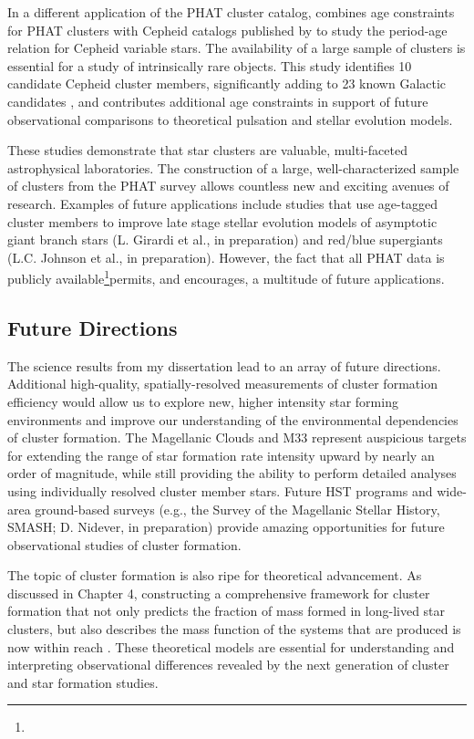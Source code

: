 \documentclass[11pt, titlepage, twoside]{article}
\begin{document}
In a different application of the PHAT cluster catalog, combines age constraints for PHAT clusters with Cepheid catalogs published by to study the period-age relation for Cepheid variable stars. The availability of a large sample of clusters is essential for a study of intrinsically rare objects. This study identifies 10 candidate Cepheid cluster members, significantly adding to 23 known Galactic candidates , and contributes additional age constraints in support of future observational comparisons to theoretical pulsation and stellar evolution models.

These studies demonstrate that star clusters are valuable, multi-faceted astrophysical laboratories. The construction of a large, well-characterized sample of clusters from the PHAT survey allows countless new and exciting avenues of research. Examples of future applications include studies that use age-tagged cluster members to improve late stage stellar evolution models of asymptotic giant branch stars (L. Girardi et al., in preparation) and red\slash blue supergiants (L.C. Johnson et al., in preparation). However, the fact that all PHAT data is publicly available\footnote{}permits, and encourages, a multitude of future applications.


\subsection{Future Directions}\label{MPSection:D1739483-E882-4D4F-BC10-2E166DB67D80}

The science results from my dissertation lead to an array of future directions. Additional high-quality, spatially-resolved measurements of cluster formation efficiency would allow us to explore new, higher intensity star forming environments and improve our understanding of the environmental dependencies of cluster formation. The Magellanic Clouds and M33 represent auspicious targets for extending the range of star formation rate intensity upward by nearly an order of magnitude, while still providing the ability to perform detailed analyses using individually resolved cluster member stars. Future HST programs and wide-area ground-based surveys (e.g., the Survey of the Magellanic Stellar History, SMASH; D. Nidever, in preparation) provide amazing opportunities for future observational studies of cluster formation.

The topic of cluster formation is also ripe for theoretical advancement. As discussed in Chapter 4, constructing a comprehensive framework for cluster formation that not only predicts the fraction of mass formed in long-lived star clusters, but also describes the mass function of the systems that are produced is now within reach . These theoretical models are essential for understanding and interpreting observational differences revealed by the next generation of cluster and star formation studies.
\end{document}
